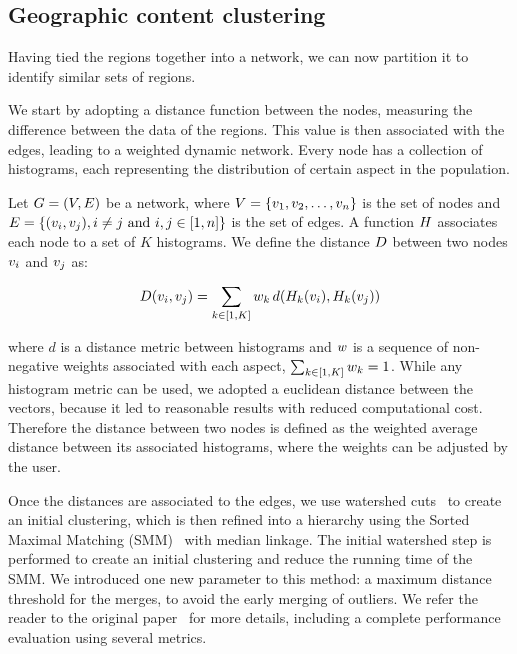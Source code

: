 \subsection{Geographic content clustering}
Having tied the regions together into a network, we can now partition it to
identify similar sets of regions. 

We start by adopting a distance function between the nodes, measuring the
difference between the data of the regions. This value is then associated with
the edges, leading to a weighted dynamic network. Every node has a collection of
histograms, each representing the distribution of certain aspect in the
population.

Let $G=(V,E)$ be a network, where
$V=\{v_1,v_2,\dots,v_n\}$ is the set of nodes and
$E=\{(v_i,v_j), i\not=j\text{ and }i,j \in [1,n]\}$ is the set of
edges. A function $H$ associates each node to a set of $K$ histograms. We
define the distance $D$ between two nodes $v_i$ and $v_j$ as:

\begin{equation}
    D(v_i,v_j)=\sum_{k \in [1,K]}{w_k\, d(H_k(v_i),H_k(v_j))}
    \label{eq:dist}
\end{equation}

\noindent where $d$ is a distance metric between histograms and $w$ is a
sequence of non-negative weights associated with each aspect,
$\sum_{k\in[1,K]}{w_k}=1$. While any histogram metric can be used, we
adopted a euclidean distance between the vectors, because it led to reasonable
results with reduced computational cost. Therefore the distance between two
nodes is defined as the weighted average distance between its associated
histograms, where the weights can be adjusted by the user.

Once the distances are associated to the edges, we use watershed
cuts~\citep{Cousty2009} to create an initial clustering, which is then refined
into a hierarchy using the Sorted Maximal Matching (SMM)~\citep{markus2017} with
median linkage. The initial watershed step is performed to create an initial
clustering and reduce the running time of the SMM. We introduced one new
parameter to this method: a maximum distance threshold for the merges, to avoid
the early merging of outliers. We refer the reader to the original
paper~\citep{markus2017} for more details, including a complete performance
evaluation using several metrics. 


